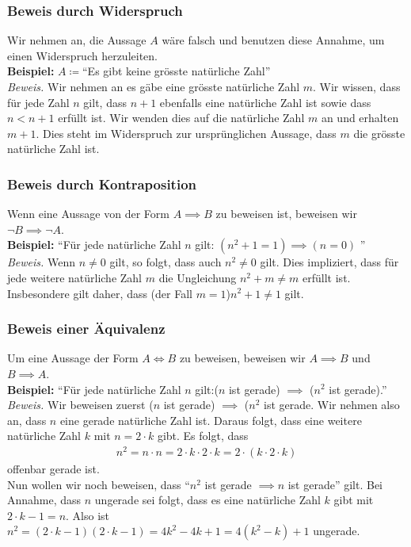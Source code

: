 	\subsubsection{Beweis durch Widerspruch}
	Wir nehmen an, die Aussage $A$ wäre falsch und benutzen diese Annahme, 
	um einen Widerspruch herzuleiten.\\ 
	\textbf{Beispiel:} $A\coloneqq$``Es gibt keine grösste natürliche Zahl''\\
	\textit{Beweis.} Wir nehmen an es gäbe eine grösste natürliche Zahl $m$.
	Wir wissen, dass für jede Zahl $n$ gilt, dass $n+1$ ebenfalls eine natürliche
	Zahl ist sowie dass $n<n+1$ erfüllt ist. Wir wenden dies auf die natürliche
	Zahl $m$ an und erhalten $m+1$. Dies steht im Widerspruch zur ursprünglichen
	Aussage, dass $m$ die grösste natürliche Zahl ist.

	\subsubsection{Beweis durch Kontraposition}
	Wenn eine Aussage von der Form $A \implies B$ zu beweisen ist, beweisen wir
	$\neg B \implies \neg A$. \\
	\textbf{Beispiel:} ``Für jede natürliche Zahl $n$ gilt: 
	$(n^2+1=1) \implies (n=0)$ '' \\
	\textit{Beweis.} Wenn $n\neq 0$ gilt, so folgt, dass auch $n^2 \neq 0$ gilt.
	Dies impliziert, dass für jede weitere natürliche Zahl $m$ die 
	Ungleichung $n^2 + m \neq m$ erfüllt ist. Insbesondere gilt daher, dass (der
	Fall $m=1$)$n^2+1\neq 1$ gilt.

	\subsubsection{Beweis einer Äquivalenz}
	Um eine Aussage der Form $A \iff B$ zu beweisen, beweisen wir $A \implies B$
	und $B \implies A$.\\
	\textbf{Beispiel:} ``Für jede natürliche Zahl $n$ gilt:($n$ ist gerade)
	$\implies$ ($n^2$ ist gerade).'' \\
	\textit{Beweis.} Wir beweisen zuerst ($n$ ist gerade) $\implies$ 
	($n^2$ ist gerade. Wir nehmen also an, dass $n$ eine gerade natürliche Zahl
	ist. Daraus folgt, dass eine weitere natürliche Zahl $k$ mit $n=2\cdot k$ gibt.
	Es folgt, dass
	\begin{align*}
		n^2 = n\cdot n = 2 \cdot k \cdot 2 \cdot k = 2 \cdot 
		(k \cdot 2 \cdot k)
	\end{align*}
	offenbar gerade ist. \\
	Nun wollen wir noch beweisen, dass ``$n^2$ ist gerade 
	$\implies n$ ist gerade'' gilt. Bei Annahme, dass $n$ ungerade sei folgt, dass
	es eine natürliche Zahl $k$ gibt mit $2 \cdot k - 1 = n$. Also ist $n^2 =
	(2 \cdot k - 1)(2 \cdot k - 1) = 4k^2-4k+1=4(k^2-k)+1$ ungerade.

